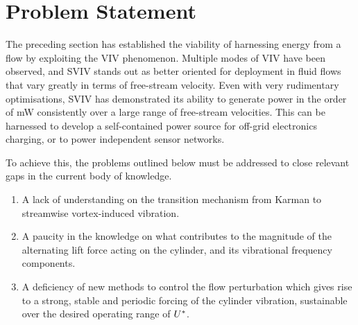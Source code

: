 \documentclass[oneside]{utmthesis}
\begin{document}

\section{Problem Statement}

The preceding section has established the viability of harnessing energy from a flow by exploiting the VIV phenomenon. Multiple modes of VIV have been observed, and SVIV stands out as better oriented for deployment in fluid flows that vary greatly in terms of free-stream velocity. Even with very rudimentary optimisations, SVIV has demonstrated its ability to generate power in the order of mW consistently over a large range of free-stream velocities. This can be harnessed to develop a self-contained power source for off-grid electronics charging, or to power independent sensor networks.


To achieve this, the problems outlined below must be addressed to close relevant gaps in the current body of knowledge.

\begin{enumerate}
  \item A lack of understanding on the transition mechanism from Karman to streamwise vortex-induced vibration.
  \item A paucity in the knowledge on what contributes to the magnitude of the alternating lift force acting on the cylinder, and its vibrational frequency components.
  \item A deficiency of new methods to control the flow perturbation which gives rise to a strong, stable and periodic forcing of the cylinder vibration, sustainable over the desired operating range of $U^{*}$.
\end{enumerate}
\end{document}
